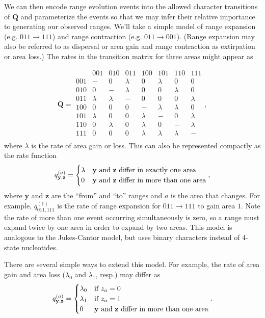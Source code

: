 \documentclass[11pt]{article}
\begin{document}
We can then encode range evolution events into the allowed character transitions of $\textbf{Q}$ and parameterize the events so that we may infer their relative importance to generating our observed ranges.
We'll take a simple model of range expansion (e.g. $011 \rightarrow 111$) and range contraction (e.g. $011 \rightarrow 001$).
(Range expansion may also be referred to as dispersal or area gain and range contraction as extirpation or area loss.)
The rates in the transition matrix for three areas might appear as

\[
\textbf{Q} = 
	\begin{array}{r|ccccccc}
		& 001 & 010 & 011 & 100 & 101 & 110 & 111 \\
		\hline
		001 & - & 0 & \lambda & 0 & \lambda & 0 & 0 \\
		010  & 0 & - & \lambda & 0 & 0 & \lambda & 0 \\
		011  & \lambda & \lambda & - & 0 & 0 & 0 & \lambda \\
		100  & 0 & 0 & 0 & - & \lambda & \lambda & 0 \\
		101  & \lambda & 0 & 0 & \lambda & - & 0 & \lambda \\
		110  & 0 & \lambda & 0 & \lambda & 0 & - & \lambda \\
		111  & 0 & 0 & 0 & \lambda & \lambda & \lambda & - \\								
	\end{array},
\]
where $\lambda$ is the rate of area gain or loss. This can also be represented compactly as the rate function
\[
q^{(a)}_{\textbf{y},\textbf{z}} =
\begin{cases}
\lambda & \text{\textbf{y} and \textbf{z} differ in exactly one area}  \\
0 & \text{\textbf{y} and \textbf{z} differ in more than one area}
\end{cases},
\]
where $\textbf{y}$ and $\textbf{z}$ are the ``from'' and ``to'' ranges and $a$ is the area that changes.
For example, $q^{(1)}_{011,111}$ is the rate of range expansion for $011 \rightarrow 111$ to gain area $1$.
Note the rate of more than one event occurring simultaneously is zero, so a range must expand twice by one area in order to expand by two areas.
This model is analogous to the Jukes-Cantor model, but uses binary characters instead of 4-state nucleotides.


There are several simple ways to extend this model. For example, the rate of area gain and area loss ($\lambda_0$ and $\lambda_1$, resp.) may differ as
\[
q^{(a)}_{\textbf{y},\textbf{z}} =
\begin{cases}
\lambda_0 & \text{if $z_a=0$}  \\
\lambda_1 & \text{if $z_a=1$} \\
0 & \text{\textbf{y} and \textbf{z} differ in more than one area}
\end{cases}.
\]
\end{document}

